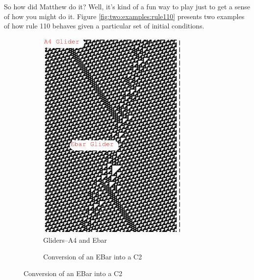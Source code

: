 \documentclass[]{article}
\begin{document}
So how did Matthew do it?
Well, it's kind of a fun way to play just to get a sense of how you might do it.
Figure \ref{fig:two:examples:rule110} presents two examples of how rule 110 behaves
given a particular set of initial conditions.
\begin{figure}[H]
	\caption{Rule 110 given a particular set of initial conditions}\label{fig:two:examples:rule110}
	\begin{subfigure}[t]{0.45\textwidth}
		\caption{Gliders--A4 and Ebar}\label{fig:cellular-automaton-rule-7}
		\includegraphics[width=\textwidth]{cellular-automaton-rule-7}
	\end{subfigure}
	\hfill
	\begin{subfigure}[t]{0.45\textwidth}
		\caption{Conversion of an EBar into a C2}\label{fig:cellular-automaton-rule-8}

\end{subfigure}
\end{figure}
\end{document}
